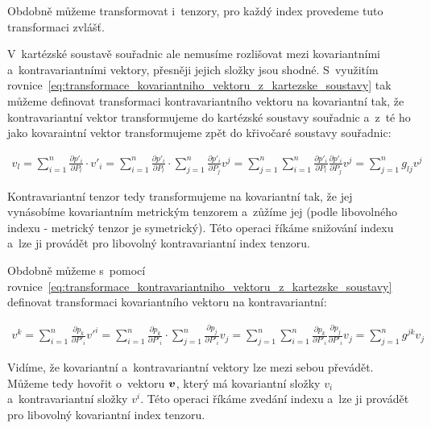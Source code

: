 Obdobně můžeme transformovat i~tenzory, pro každý index provedeme tuto transformaci zvlášť.

V~kartézské soustavě souřadnic ale nemusíme rozlišovat mezi kovariantními a~kontravariantními vektory, přesněji jejich složky jsou shodné. S~využitím rovnice~\eqref{eq:transformace_kovariantniho_vektoru_z_kartezske_soustavy} tak můžeme definovat transformaci kontravariantního vektoru na kovariantní tak, že kontravariantní vektor transformujeme do kartézské soustavy souřadnic a~z~té ho jako kovaraintní vektor transformujeme zpět do křivočaré soustavy souřadnic:

\begin{equation}
\begin{split}
v_l = \sum_{i=1}^n \frac{\partial p'_i}{\partial P_l} \cdot v'_i = \sum_{i=1}^n \frac{\partial p'_i}{\partial P_l} \cdot \sum_{j=1}^n \frac{\partial p'_i}{\partial P_j} v^j = \sum_{j=1}^n \sum_{i=1}^n \frac{\partial p'_i}{\partial P_l} \frac{\partial p'_i}{\partial P_j} v^j = \sum_{j=1}^n g_{lj} v^j
\end{split}
\end{equation}

Kontravariantní tenzor tedy transformujeme na kovariantní tak, že jej vynásobíme kovariantním metrickým tenzorem a~zůžíme jej (podle libovolného indexu - metrický tenzor je symetrický). Této operaci říkáme snižování indexu a~lze ji provádět pro libovolný kontravariantní index tenzoru.

Obdobně můžeme s~pomocí rovnice~\eqref{eq:transformace_kontravariantniho_vektoru_z_kartezske_soustavy} definovat transformaci kovariantního vektoru na kontravariantní:

\begin{equation}
\begin{split}
v^k = \sum_{i=1}^n \frac{\partial p_k}{\partial P'_i} v'^i = \sum_{i=1}^n \frac{\partial p_k}{\partial P'_i} \cdot \sum_{j=1}^n \frac{\partial p_j}{\partial P'_i} v_j = \sum_{j=1}^n \sum_{i=1}^n \frac{\partial p_k}{\partial P'_i} \frac{\partial p_j}{\partial P'_i} v_j = \sum_{j=1}^n g^{jk} v_j
\end{split}
\end{equation}

Vidíme, že kovariantní a~kontravariantní vektory lze mezi sebou převádět. Můžeme tedy hovořit o~vektoru \(\boldsymbol{v}\), který má kovariantní složky \(v_i\) a~kontravariantní složky \(v^i\). Této operaci říkáme zvedání indexu a~lze ji provádět pro libovolný kovariantní index tenzoru.

